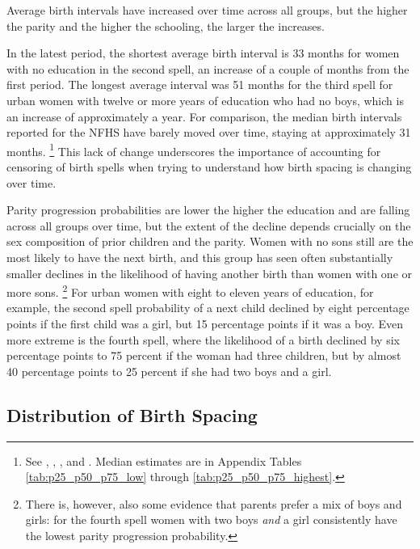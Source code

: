\documentclass[12pt,letterpaper]{article}
\begin{document}
Average birth intervals have increased over time across all groups, but
the higher the parity and the higher the schooling, the larger the
increases.

In the latest period, the shortest average birth interval is 33 months for
women with no education in the second spell, an increase of a couple of
months from the first period.
The longest average interval was 51 months for the third spell for urban women with twelve or 
more years of education who had no boys, which is an increase of approximately a year.
For comparison, the median birth intervals reported for the NFHS have barely
moved over time, staying at approximately 31 months.%
\footnote{
See
\citet[][p.\ 110--112]{International-Institute-for-Population-Sciences-IIPS1995},
\citet[][p.\ 98--103]{International-Institute-for-Population-Sciences-IIPS2000},
\citet[][p.\ 88--91]{International-Institute-for-Population-Sciences-IIPS2007}, and
\citet[][p.\ 81--82]{International-Institute-for-Population-Sciences-IIPS2017}.
Median estimates are in
Appendix Tables \ref{tab:p25_p50_p75_low} through \ref{tab:p25_p50_p75_highest}.
}
This lack of change underscores the importance of accounting for censoring of birth spells 
when trying to understand how birth spacing is changing over time.

Parity progression probabilities are lower the higher the education and are
falling across all groups over time, but the extent of the decline depends crucially on 
the sex composition of prior children and the parity.
Women with no sons still are the most likely to 
have the next birth, and this group has seen often substantially smaller declines in
the likelihood of having another birth than women with one or more sons.%
\footnote{
There is, however, also some evidence that parents prefer a mix of boys and girls: for 
the fourth spell women with two boys \emph{and} a girl
consistently have the lowest parity progression probability.
}
For urban women with eight to eleven years of education, for example, the second spell
probability of a next child declined by eight percentage points if the first child was a 
girl, but 15 percentage points if it was a boy.
Even more extreme is the fourth spell, where the likelihood of a birth declined by six 
percentage points to 75 percent if the woman had three children, but by almost 40 
percentage points to 25 percent if she had two boys and a girl.


\subsection{Distribution of Birth Spacing}
\end{document}
